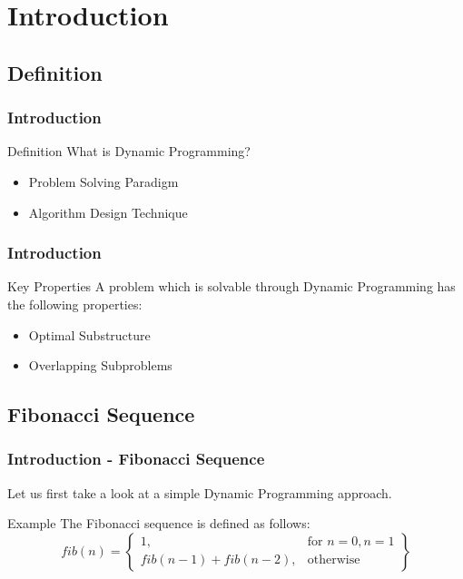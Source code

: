 \section{Introduction}
\subsection{Definition}

\begin{frame}
  \frametitle{Introduction}
  \begin{block}{Definition}
   What is Dynamic Programming?
   \begin{itemize}
     \item Problem Solving Paradigm
     \item Algorithm Design Technique
   \end{itemize}
  \end{block}
\end{frame}

\begin{frame}
  \frametitle{Introduction}
  \begin{block}{Key Properties}
   A problem which is solvable through Dynamic
   Programming has the following properties:
   \begin{itemize}
     \item Optimal Substructure
     \item Overlapping Subproblems
   \end{itemize}
  \end{block}

\end{frame}

\subsection{Fibonacci Sequence}
\begin{frame}
  \frametitle{Introduction - Fibonacci Sequence}
  Let us first take a look at a simple Dynamic Programming approach.

  \begin{block}{Example}
    The Fibonacci sequence is defined as follows:
    \\
    \[
    fib(n) = \left\{\begin{array}{lr}
      1, & \text{for } n = 0, n = 1\\
      fib(n-1) + fib(n-2), & \text{otherwise}
      \end{array}\right\}
    \]
    \\
  \end{block}
\end{frame}



